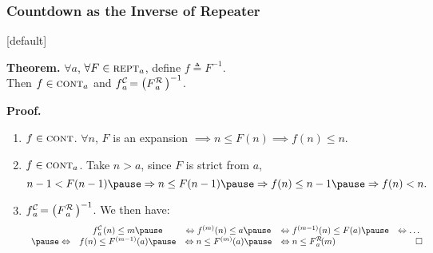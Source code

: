 \begin{frame}
\frametitle{Countdown as the Inverse of Repeater}
\setlength{\leftmargini}{3.5em}
[default]

\textbf{Theorem.} $\forall a$, $\forall F\in \text{\scshape{rept}}_a$, define $f\triangleq F^{-1}$. 
\\ Then $f\in \text{\scshape{cont}}_a$ and $\cdt{f}{a}~ = \left(\rf{F}{a}\ \right)^{-1}$.

\bigskip

\pause 
\textbf{Proof.}

\begin{enumerate}
	\pause 
	\item $f\in \text{\scshape{cont}}$. \pause  $\forall n$, $F$ is an expansion $\implies n \le F(n)\implies f(n)\le n$.
	
	\smallskip
	
	\pause 
	\item $f\in \text{\scshape{cont}}_a$. \pause Take $n> a$, since $F$ is strict from $a$, \pause
	\vspace{-1ex}
	\begin{equation*}
	\displayindent0pt
	\displaywidth\textwidth
	n-1 < F(n-1) \pause \implies n\le F(n-1) \pause \implies f(n)\le n - 1 \pause \implies f(n) < n.
	\end{equation*}
	\vspace{-3.5ex}
	\pause 
	\item $\cdt{f}{a}~ = \left(\rf{F}{a}\ \right)^{-1}$. \pause  We then have:
	\vspace{-1.5ex}
	\begin{equation*}
	\displayindent0pt
	\displaywidth\textwidth
	\begin{array}{cccll}
	& \cdt{f}{a}(n)\le m \pause & \iff f^{(m)}(n)\le a \pause & \iff f^{(m-1)}(n)\le F(a) 
	\pause & \iff \ldots \\
    \pause \iff & f(n)\le F^{(m-1)}(a) \pause & \iff n\le F^{(m)}(a) \pause & \iff n\le \rf{F}{a}(m) & \qed
	\end{array}
	\end{equation*}
\end{enumerate}

\end{frame}


